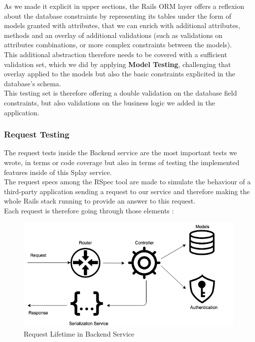 \documentclass{eplmastersthesis}
\begin{document}
          As we made it explicit in upper sections, the Rails ORM layer offers
          a reflexion about the database constraints by representing its
          tables under the form of models granted with attributes, that we can
          enrich with additional attributes, methods and an overlay of
          additional validations (such as validations on attributes
          combinations, or more complex constraints between the models).\\

          This additional abstraction therefore needs to be covered with a
          sufficient validation set, which we did by applying
          \textbf{Model Testing}, challenging that overlay applied to the
          models but also the basic constraints explicited in the database's
          schema.\\

          This testing set is therefore offering a double validation on the
          database field constraints, but also validations on the business
          logic we added in the application.

        \subsubsection{Request Testing}

          The request tests inside the Backend service are the most important
          tests we wrote, in terms or code coverage but also in terms of
          testing the implemented features inside of this Splay service.\\

          The request specs among the RSpec tool are made to simulate
          the behaviour of a third-party application sending a request to
          our service and therefore making the whole Rails stack running
          to provide an answer to this request.\\
          Each request is therefore going through those elements :\\

          \begin{figure}[H]
            \centering
            \includegraphics[scale=0.6]{figures/request_test.png}
            \caption{\label{request_test} Request Lifetime in Backend Service}
          \end{figure}
\end{document}
